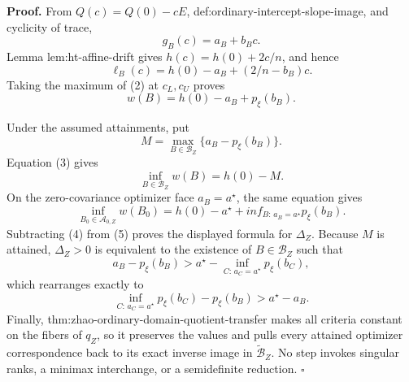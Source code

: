 \textbf{Proof.}
From \(Q(c)=Q(0)-cE\), def:ordinary-intercept-slope-image, and cyclicity of trace,
\[
g_B(c)=a_B+b_Bc.
\tag{1}
\]
Lemma lem:ht-affine-drift gives \(h(c)=h(0)+2c/n\), and hence
\[
\ell_B(c)=h(0)-a_B+(2/n-b_B)c.
\tag{2}
\]
Taking the maximum of (2) at \(c_L,c_U\) proves
\[
w(B)=h(0)-a_B+p_\xi(b_B).
\tag{3}
\]

Under the assumed attainments, put
\[
M=\max_{B\in\mathcal B_Z}\{a_B-p_\xi(b_B)\}.
\]
Equation (3) gives
\[
\inf_{B\in\mathcal B_Z}w(B)=h(0)-M.
\tag{4}
\]
On the zero-covariance optimizer face \(a_B=a^\star\), the same equation gives
\[
\inf_{B_0\in\mathcal A_{0,Z}}w(B_0)
=h(0)-a^\star+inf_{B:\,a_B=a^\star}p_\xi(b_B).
\tag{5}
\]
Subtracting (4) from (5) proves the displayed formula for \(\Delta_Z\).  Because \(M\) is attained, \(\Delta_Z>0\) is equivalent to the existence of \(B\in\mathcal B_Z\) such that
\[
a_B-p_\xi(b_B)
>a^\star-\inf_{C:\,a_C=a^\star}p_\xi(b_C),
\]
which rearranges exactly to
\[
\inf_{C:\,a_C=a^\star}p_\xi(b_C)-p_\xi(b_B)
>a^\star-a_B.
\]
Finally, thm:zhao-ordinary-domain-quotient-transfer makes all criteria constant on the fibers of \(q_Z\), so it preserves the values and pulls every attained optimizer correspondence back to its exact inverse image in \(\widetilde{\mathcal B}_Z\).  No step invokes singular ranks, a minimax interchange, or a semidefinite reduction.  \(\square\)